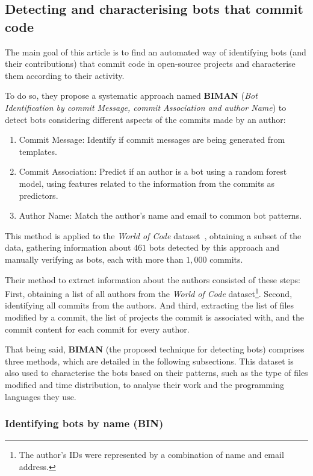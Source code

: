 \documentclass[a4paper, 12pt]{book}
\begin{document}
\subsection{Detecting  and characterising bots that commit code}
\label{ssec:dey}

The main goal of this article is to find an automated way of identifying bots (and their contributions) that commit code in open-source projects and characterise them according to their activity.

To do so, they propose a systematic approach named \textbf{BIMAN} (\emph{Bot Identification by commit Message, commit Association and author Name}) to detect bots considering different aspects of the commits made by an author:
\begin{enumerate}
    \item Commit Message: Identify if commit messages are being generated from templates.
    \item Commit Association: Predict if an author is a bot using a random forest model, using features related to the information from the commits as predictors.
    \item Author Name: Match the author's name and email to common bot patterns.
\end{enumerate}

This method is applied to the \emph{World of Code} dataset~\cite{mockus-woc}, obtaining a subset of the data, gathering information about $461$ bots detected by this approach and manually verifying as bots, each with more than $1,000$ commits.

Their method to extract information about the authors consisted of these steps: First, obtaining a list of all authors from the \emph{World of Code} dataset\footnote{The author's IDs were represented by a combination of name and email address.}. 
Second, identifying all commits from the authors. And third, extracting the list of files modified by a commit, the list of projects the commit is associated with, and the commit content for each commit for every author.

That being said, \textbf{BIMAN} (the proposed technique for detecting bots) comprises three methods, which are detailed in the following subsections. This dataset is also used to characterise the bots based on their patterns, such as the type of files modified and time distribution, to analyse their work and the programming languages they use.

\subsubsection{Identifying bots by name (BIN)}
\label{sssec:dey-bin}
\end{document}
